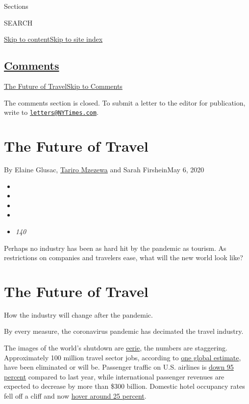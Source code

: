 Sections

SEARCH

\protect\hyperlink{site-content}{Skip to
content}\protect\hyperlink{site-index}{Skip to site index}

\hypertarget{comments}{%
\subsection{\texorpdfstring{\protect\hyperlink{commentsContainer}{Comments}}{Comments}}\label{comments}}

\href{}{The Future of Travel}\href{}{Skip to Comments}

The comments section is closed. To submit a letter to the editor for
publication, write to
\href{mailto:letters@NYTimes.com}{\nolinkurl{letters@NYTimes.com}}.

\hypertarget{the-future-of-travel}{%
\section{The Future of Travel}\label{the-future-of-travel}}

By Elaine Glusac,
\href{https://www.nytimes3xbfgragh.onion/by/tariro-mzezewa}{Tariro
Mzezewa} and Sarah FirsheinMay 6, 2020

\begin{itemize}
\item
\item
\item
\item
\item
  \emph{140}
\end{itemize}

Perhaps no industry has been as hard hit by the pandemic as tourism. As
restrictions on companies and travelers ease, what will the new world
look like?

\hypertarget{the-future-of-travel-1}{%
\section{The Future of Travel}\label{the-future-of-travel-1}}

How the industry will change after the pandemic.

By every measure, the coronavirus pandemic has decimated the travel
industry.

The images of the world's shutdown are
\href{https://www.nytimes3xbfgragh.onion/2020/02/27/world/europe/milan-coronavirus.html}{eerie},
the numbers are staggering. Approximately 100 million travel sector
jobs, according to
\href{https://wttc.org/News-Article/WTTC-now-estimates-over-100-million-jobs-losses-in-the-Travel-\&-Tourism-sector-and-alerts-G20-countries-to-the-scale-of-the-crisis}{one
global estimate}, have been eliminated or will be. Passenger traffic on
U.S. airlines is
\href{https://www.nytimes3xbfgragh.onion/2020/04/14/business/coronavirus-airlines-bailout-treasury-department.html}{down
95 percent} compared to last year, while international passenger
revenues are expected to decrease by more than \$300 billion. Domestic
hotel occupancy rates fell off a cliff and now
\href{https://str.com/press-release/str-us-hotel-results-week-ending-25-april}{hover
around 25 percent}.

